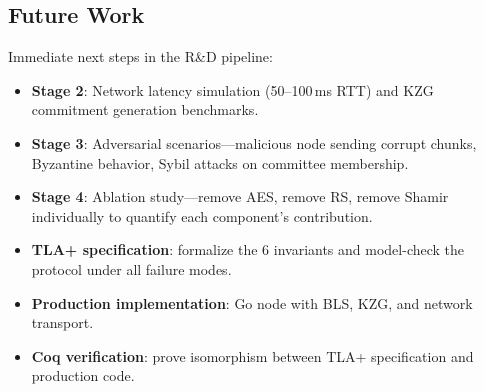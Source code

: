 \subsection{Future Work}

Immediate next steps in the R\&D pipeline:

\begin{itemize}
  \item \textbf{Stage 2}: Network latency simulation (50--100\,ms RTT)
    and KZG commitment generation benchmarks.
  \item \textbf{Stage 3}: Adversarial scenarios---malicious node sending
    corrupt chunks, Byzantine behavior, Sybil attacks on committee
    membership.
  \item \textbf{Stage 4}: Ablation study---remove AES, remove RS,
    remove Shamir individually to quantify each component's
    contribution.
  \item \textbf{TLA+ specification}: formalize the 6 invariants and
    model-check the protocol under all failure modes.
  \item \textbf{Production implementation}: Go node with BLS, KZG, and
    network transport.
  \item \textbf{Coq verification}: prove isomorphism between TLA+
    specification and production code.
\end{itemize}
